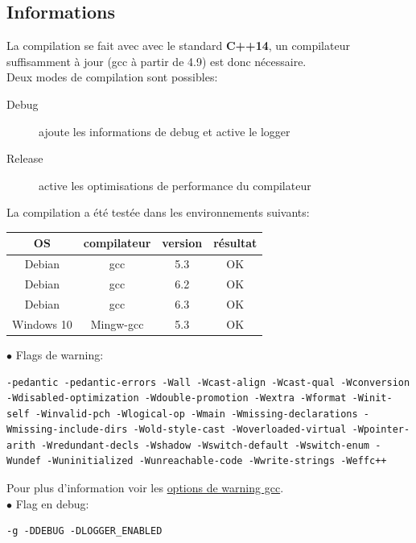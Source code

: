 \documentclass[article, backcover, french, nodocumentinfo]{upmethodology-document}
\begin{document}
		\subsection{Informations}
				La compilation se fait avec avec le standard \textbf{C++14}, un compilateur suffisamment à jour (gcc à partir de 4.9) est donc nécessaire.\\
				Deux modes de compilation sont possibles:
				\begin{description}
					\item[Debug] ajoute les informations de debug et active le logger
					\item[Release] active les optimisations de performance du compilateur
				\end{description}
				La compilation a été testée dans les environnements suivants:
				\begin{center}
					\begin{tabular}{|c|c|c|c|}
						\hline
						OS & compilateur & version & résultat\\
						\hline
						Debian & gcc & 5.3 & OK\cellcolor{green}\\
						\hline
						Debian & gcc & 6.2 & OK\cellcolor{green}\\
						\hline
						Debian & gcc & 6.3 & OK\cellcolor{green}\\
						\hline
						Windows 10 & Mingw-gcc & 5.3 & OK\cellcolor{green}\\
						\hline
					\end{tabular}
				\end{center}
				$\bullet$ Flags de warning:
				\begin{lstlisting}[breaklines=true,breakatwhitespace=true,breakindent=0pt,columns=fixed,keepspaces=true,frame=single,basicstyle=\footnotesize\sffamily]
-pedantic -pedantic-errors -Wall -Wcast-align -Wcast-qual -Wconversion -Wdisabled-optimization -Wdouble-promotion -Wextra -Wformat -Winit-self -Winvalid-pch -Wlogical-op -Wmain -Wmissing-declarations -Wmissing-include-dirs -Wold-style-cast -Woverloaded-virtual -Wpointer-arith -Wredundant-decls -Wshadow -Wswitch-default -Wswitch-enum -Wundef -Wuninitialized -Wunreachable-code -Wwrite-strings -Weffc++\end{lstlisting}
				Pour plus d'information voir les \href{https://gcc.gnu.org/onlinedocs/gcc/Warning-Options.html}{options de warning gcc}.\\
				$\bullet$ Flag en debug:
				\begin{lstlisting}[breaklines=true,breakatwhitespace=true,breakindent=0pt,columns=fixed,keepspaces=true,frame=single,basicstyle=\footnotesize\sffamily]
-g -DDEBUG -DLOGGER_ENABLED\end{lstlisting}
\end{document}
